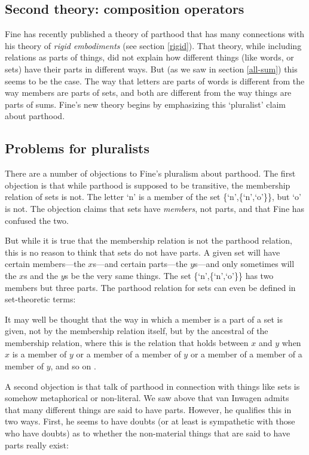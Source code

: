 \documentclass[11pt]{article}
\newenvironment{squote}{%
\begin{spacing}{1}
\begin{list}{}{%
\setlength{\labelwidth}{0pt}%
\rightmargin\leftmargin%
}
\item\relax
}{%
\end{list}%
\end{spacing}
}
\begin{document}
\begin{spacing}{1.5}
\section{Second theory: composition operators}
\label{fine-c}
Fine has recently published a theory of parthood that has many
connections with his theory of {\em rigid embodiments} (see section
\ref{rigid}).  That theory, while including relations as parts of
things, did not explain how different things (like words, or sets)
have their parts in different ways.  But (as we saw in section
\ref{all-sum}) this seems to be the case.  The way that letters are
parts of words is different from the way members are parts of sets,
and both are different from the way things are parts of sums.  Fine's
new theory begins by emphasizing this `pluralist' claim about
parthood.

\subsection{Problems for pluralists}
\label{sets}
There are a number of objections to Fine's pluralism about parthood.
The first objection is that while parthood is supposed to be
transitive, the membership relation of sets is not.  The letter `n' is
a member of the set \{`n',\{`n',`o'\}\}, but `o' is not.  The
objection claims that sets have {\em members}, not parts, and that
Fine has confused the two.

But while it is true that the membership relation is not the parthood
relation, this is no reason to think that sets do not have parts.  A
given set will have certain members---the $x$s---and certain
parts---the $y$s---and only sometimes will the $x$s and the $y$s be
the very same things.  The set \{`n',\{`n',`o'\}\} has two members
but three parts.  The parthood relation for sets can even be defined
in set-theoretic terms:

\begin{squote}
It may well be thought that the way in which a member is a part of a
set is given, not by the membership relation itself, but by the
ancestral of the membership relation, where this is the relation that
holds between $x$ and $y$ when $x$ is a member of $y$ or a member of a
member of $y$ or a member of a member of a member of $y$, and so on
\citep[563]{fine2010}.
\end{squote}

A second objection is that talk of parthood in connection with things
like sets is somehow metaphorical or non-literal.  We saw above that
van Inwagen admits that many different things are said to have parts.
However, he qualifies this in two ways.  First, he seems to have
doubts (or at least is sympathetic with those who have doubts) as to
whether the non-material things that are said to have parts really
exist:


\end{spacing}
\end{document}
